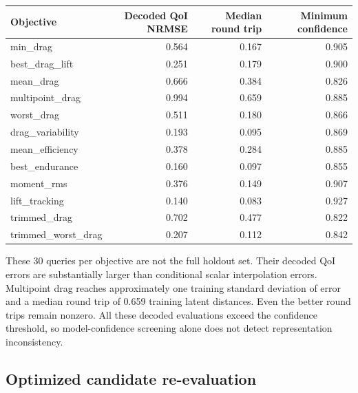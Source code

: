 \begin{center}\small\begin{tabular}{lrrr}\toprule Objective & Decoded QoI NRMSE & Median round trip & Minimum confidence\\\midrule

min\_drag & 0.564 & 0.167 & 0.905 \\

best\_drag\_lift & 0.251 & 0.179 & 0.900 \\

mean\_drag & 0.666 & 0.384 & 0.826 \\

multipoint\_drag & 0.994 & 0.659 & 0.885 \\

worst\_drag & 0.511 & 0.180 & 0.866 \\

drag\_variability & 0.193 & 0.095 & 0.869 \\

mean\_efficiency & 0.378 & 0.284 & 0.885 \\

best\_endurance & 0.160 & 0.097 & 0.855 \\

moment\_rms & 0.376 & 0.149 & 0.907 \\

lift\_tracking & 0.140 & 0.083 & 0.927 \\

trimmed\_drag & 0.702 & 0.477 & 0.822 \\

trimmed\_worst\_drag & 0.207 & 0.112 & 0.842 \\

\bottomrule\end{tabular}\end{center}

These 30 queries per objective are not the full holdout set. Their decoded QoI errors are substantially larger than conditional scalar interpolation errors. Multipoint drag reaches approximately one training standard deviation of error and a median round trip of 0.659 training latent distances. Even the better round trips remain nonzero. All these decoded evaluations exceed the confidence threshold, so model-confidence screening alone does not detect representation inconsistency.

\subsection{Optimized candidate re-evaluation}

